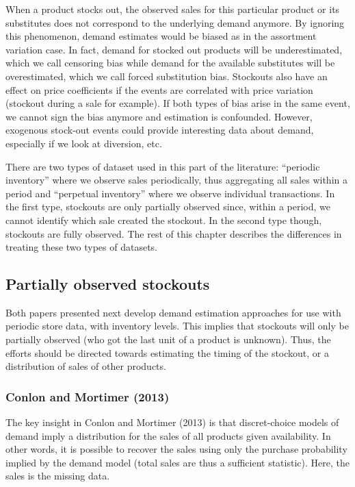 When a product stocks out, the observed sales for this particular product or its substitutes does not correspond to the underlying demand anymore. By ignoring this phenomenon, demand estimates would be biased as in the assortment variation case. In fact, demand for stocked out products will be underestimated, which we call censoring bias while demand for the available substitutes will be overestimated, which we call forced substitution bias. Stockouts also have an effect on price coefficients if the events are correlated with price variation (stockout during a sale for example). If both types of bias arise in the same event, we cannot sign the bias anymore and estimation is confounded. However, exogenous stock-out events could provide interesting data about demand, especially if we look at diversion, etc.

There are two types of dataset used in this part of the literature: ``periodic inventory'' where we observe sales periodically, thus aggregating all sales within a period and ``perpetual inventory'' where we observe individual transactions. In the first type, stockouts are only partially observed since, within a period, we cannot identify which sale created the stockout. In the second type though, stockouts are fully observed. The rest of this chapter describes the differences in treating these two types of datasets.

\subsection{Partially observed stockouts}

Both papers presented next develop demand estimation approaches for use with periodic store data, with inventory levels. This implies that stockouts will only be partially observed (who got the last unit of a product is unknown). Thus, the efforts should be directed towards estimating the timing of the stockout, or a distribution of sales of other products.

\subsubsection{Conlon and Mortimer (2013)}

The key insight in Conlon and Mortimer (2013) is that discret-choice models of demand imply a distribution for the sales of all products given availability. In other words, it is possible to recover the sales using only the purchase probability implied by the demand model (total sales are thus a sufficient statistic). Here, the sales is the missing data.

